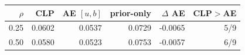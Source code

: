 \begin{tabular}{rrrrrr}
\toprule
$\rho$ & CLP & AE $[u,b]$ & prior-only & $\Delta$ AE & CLP$>$AE \\
\midrule
0.25 & 0.0602 & 0.0537 & 0.0729 & -0.0065 & 5/9 \\
0.50 & 0.0580 & 0.0523 & 0.0753 & -0.0057 & 6/9 \\
\bottomrule
\end{tabular}

